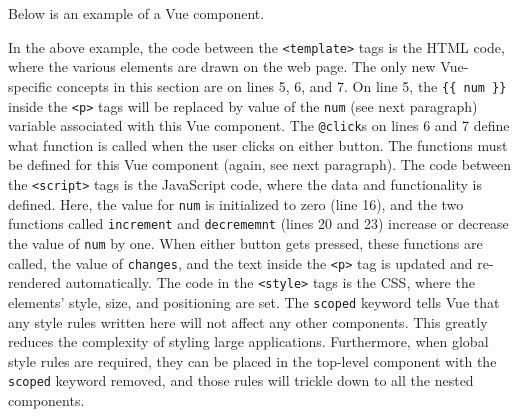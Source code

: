 Below is an example of a Vue component.
%

%
In the above example, the code between the  \texttt{<template>} tags 
is the HTML code, where the various elements are drawn on the web page.
The only new Vue-specific concepts in this section are on lines 5, 6, and 7. 
On line 5, the \texttt{\{\{~num~\}\}} inside the \texttt{<p>} tags will be replaced by 
value of the \texttt{num} (see next paragraph) variable associated with this Vue component.
The \texttt{@click}s on lines 6 and 7 define what function is called 
when the user clicks on either button. 
The functions must be defined for this Vue component (again, see next paragraph). 
\newline\newline 
The code between the \texttt{<script>} tags is the JavaScript code,
where the data and functionality is defined. Here, the value for \texttt{num}
is initialized to zero (line 16), and the two functions called 
\texttt{increment} and \texttt{decrememnt} (lines 20 and 23)
increase or decrease the value of \texttt{num} by one. 
When either button gets pressed, these functions are called, 
the value of \texttt{changes}, 
and the text inside the \texttt{<p>} tag is updated and re-rendered automatically.
\newline\newline
The code in the \texttt{<style>} tags is the CSS, where the 
elements' style, size, and positioning are set. 
The \texttt{scoped} keyword tells Vue that any style rules written here will not affect
any other components. This greatly reduces the complexity of styling large applications. 
Furthermore, when global style rules are required, they can be placed in the top-level 
component with the \texttt{scoped} keyword removed, and those rules will trickle 
down to all the nested components. 
